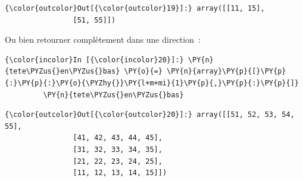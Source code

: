 \begin{Verbatim}[commandchars=\\\{\}]
{\color{outcolor}Out[{\color{outcolor}19}]:} array([[11, 15],
                [51, 55]])
\end{Verbatim}
            
    Ou bien retourner complètement dans une direction~:

    \begin{Verbatim}[commandchars=\\\{\}]
{\color{incolor}In [{\color{incolor}20}]:} \PY{n}{tete\PYZus{}en\PYZus{}bas} \PY{o}{=} \PY{n}{array}\PY{p}{[}\PY{p}{:}\PY{p}{:}\PY{o}{\PYZhy{}}\PY{l+m+mi}{1}\PY{p}{,}\PY{p}{:}\PY{p}{]}
         \PY{n}{tete\PYZus{}en\PYZus{}bas}
\end{Verbatim}


\begin{Verbatim}[commandchars=\\\{\}]
{\color{outcolor}Out[{\color{outcolor}20}]:} array([[51, 52, 53, 54, 55],
                [41, 42, 43, 44, 45],
                [31, 32, 33, 34, 35],
                [21, 22, 23, 24, 25],
                [11, 12, 13, 14, 15]])
\end{Verbatim}